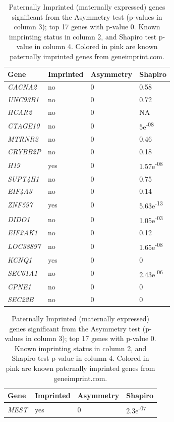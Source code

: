 \documentclass[a4paper, 11pt]{article}
\begin{document}
\begin{table}[!ht]
\parbox{.45\linewidth}{
\begin{tabular}{l|lll}
Gene & Imprinted & Asymmetry & Shapiro \\ \hline
\emph{CACNA2} & no & 0 & 0.58 \\ \hline
\emph{UNC93B1} & no &  0 & 0.72\\ \hline
\emph{HCAR2} & no &  0 & NA\\ \hline
\emph{CTAGE10} & no &  0 & 5e\textsuperscript{-08}\\ \hline
\emph{MTRNR2} & no & 0 & 0.46\\ \hline
\emph{CRYBB2P} & no &  0 & 0.18 \\ \hline
\rowcolor{mistyrose}
\emph{H19} & yes &  0 & 1.57e\textsuperscript{-08}\\ \hline
\emph{SUPT4H1} & no &  0 & 0.75\\ \hline
\emph{EIF4A3} & no &  0 & 0.14\\ \hline
\rowcolor{mistyrose}
\emph{ZNF597} & yes &  0 &5.63e\textsuperscript{-13}\\ \hline
\emph{DIDO1} & no &  0 & 1.05e\textsuperscript{-03}\\ \hline
\emph{EIF2AK1} & no &  0 & 0.12\\ \hline
\emph{LOC38897} & no & 0 & 1.65e\textsuperscript{-08}\\ \hline
\rowcolor{mistyrose}
\emph{KCNQ1} & yes &  0 & 0 \\ \hline
\emph{SEC61A1} & no &  0 & 2.43e\textsuperscript{-06}\\ \hline
\emph{CPNE1} & no &  0 & 0\\ \hline
\emph{SEC22B} & no &  0 & 0\\ \hline


\end{tabular}
\caption{\label{tab:PaternalGenes} Paternally Imprinted  (maternally expressed) genes significant from the Asymmetry test (p-values in column 3); top 17 genes with p-value 0. Known imprinting status in column 2, and Shapiro test p-value in column 4. Colored in pink are known paternally imprinted genes from geneimprint.com.}
}
\quad
\parbox{.45\linewidth}{

\begin{tabular}{l|lll}
Gene & Imprinted & Asymmetry & Shapiro \\ \hline

\rowcolor{lavender}
\emph{MEST} & yes & 0 & 2.3e\textsuperscript{-07}\\ \hline


\end{tabular}}
\end{table}
\end{document}
